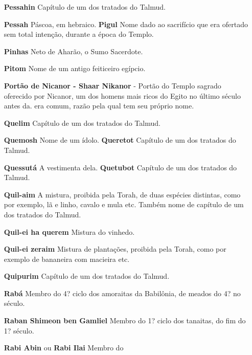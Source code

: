 \begin{itemize}
\item[\textbf{Pessahin}] Capítulo de um dos trata­dos do Talmud.

\item[\textbf{Pessah} Páscoa, em hebraico. \textbf{Pigul}] Nome dado ao
sacrifício que era ofertado sem total intenção, duran­te a época do
Templo.

\item[\textbf{Pinhas}] Neto de Aharão, o Sumo Sa­cerdote.

\item[\textbf{Pitom}] Nome de um antigo feiticeiro egípcio.

\item[\textbf{Portão de Nicanor - Shaar Nikanor}] - Portão do Templo sagrado
oferecido por Nicanor, um dos homens mais ri­cos do Egito no último
século antes da. era comum, razão pela qual tem seu próprio nome.

\item[\textbf{Quelim}] Capítulo de um dos tratados do Talmud.

\item[\textbf{Quemosh} Nome de um ídolo. \textbf{Queretot}] Capítulo de um
dos trata­dos do Talmud.

\item[\textbf{Quessutá} A vestimenta dela. \textbf{Quetubot}] Capítulo de
um dos trata­dos do Talmud.

\item[\textbf{Quil-aim}] A mistura, proibida pela Torah, de duas espécies
distintas, co­mo por exemplo, lã e linho, cavalo e mula etc. Também nome
de capítulo de um dos tratados do Talmud.

\item[\textbf{Quil-ei ha querem}] Mistura do vinhedo.

\item[\textbf{Quil-ei zeraim}] Mistura de planta­ções, proibida pela Torah,
como por exemplo de bananeira com macieira etc.

\item[\textbf{Quipurim}] Capítulo de um dos trata­dos do Talmud.

\item[\textbf{Rabá}] Membro do 4? ciclo dos amo­raitas da Babilônia, de
meados do 4? no século.

\item[\textbf{Raban Shimeon ben Gamliel}] Mem­bro do 1? ciclo dos tanaitas,
do fim do 1? século.

\item[\textbf{Rabi Abin} ou \textbf{Rabi Ilai}] Membro do


\end{itemize}
